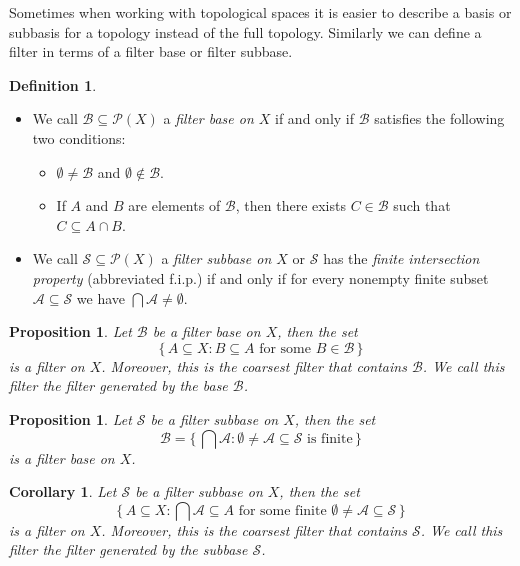 \documentclass[12pt]{article}
\theoremstyle{plain}
\newtheorem{prop}[thm]{Proposition}
\newtheorem{cor}[thm]{Corollary}
\theoremstyle{definition}
\newtheorem{defn}[thm]{Definition}
\newcommand{\calA}{\mathcal{A}}
\newcommand{\calB}{\mathcal{B}}
\newcommand{\calP}{\mathcal{P}}
\newcommand{\calS}{\mathcal{S}}
\begin{document}
Sometimes when working with topological spaces it is easier to describe a basis or subbasis for a topology instead of the full topology.
Similarly we can define a filter in terms of a filter base or filter subbase.

\begin{defn}
  \begin{itemize}
    \item[(a)] We call $\calB \subseteq \calP(X)$ a \textsl{filter base on $X$} if and only if $\calB$ satisfies the following two conditions:
    \begin{itemize}
      \item[(1)] $\emptyset \ne \calB$ and $\emptyset \not\in \calB$.
        
      \item[(2)] If $A$ and $B$ are elements of $\calB$, then there exists $C \in \calB$ such that $C \subseteq A \cap B$.
    \end{itemize}

    \item[(b)] We call $\calS \subseteq \calP(X)$ a \textsl{filter subbase on $X$} or $\calS$ has the \textsl{finite intersection property} (abbreviated f.i.p.) if and only if for every nonempty finite subset $\calA \subseteq \calS$ we have $\bigcap \calA \ne \emptyset$.
  \end{itemize}
\end{defn}

\begin{prop}
  \label{prop:fltBase}
  Let $\calB$ be a filter base on $X$, then the set
  \[
    \{\, A \subseteq X : \mbox{$B \subseteq A$ for some $B \in \calB$} \,\}
  \]
  is a filter on $X$.
  Moreover, this is the coarsest filter that contains $\calB$.
  We call this filter the \textsl{filter generated by the base $\calB$}.
\end{prop}

\begin{prop}
  Let $\calS$ be a filter subbase on $X$, then the set
  \[
     \calB = \bigl\{\, \bigcap \calA : \mbox{$\emptyset \ne \calA \subseteq \calS$ is finite} \,\bigr\}
  \]
  is a filter base on $X$. 
\end{prop}
\begin{cor}
  \label{cor:fltSubbase}
  Let $\calS$ be a filter subbase on $X$, then the set
  \[
    \{\, A \subseteq X : \mbox{$\bigcap\calA \subseteq A$ for some finite $\emptyset \ne \calA \subseteq \calS$} \,\}
  \]
  is a filter on $X$.
  Moreover, this is the coarsest filter that contains $\calS$.
  We call this filter the \textsl{filter generated by the subbase $\calS$}.
\end{cor}
\end{document}

